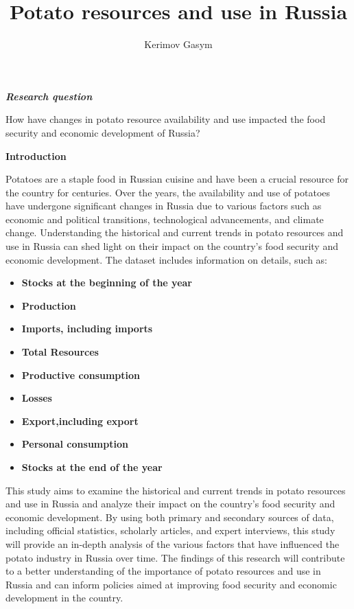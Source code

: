 \documentclass[
  12pt,
]{article}
\title{Potato resources and use in Russia}
\author{Kerimov Gasym}
\date{}
\begin{document}
\maketitle

\textbf{\emph{Research question }}

How have changes in potato resource availability and use impacted the food security and economic development of Russia?

\textbf{Introduction}

Potatoes are a staple food in Russian cuisine and have been a crucial resource for the country for centuries. Over the years, the availability and use of potatoes have undergone significant changes in Russia due to various factors such as economic and political transitions, technological advancements, and climate change. Understanding the historical and current trends in potato resources and use in Russia can shed light on their impact on the country's food security and economic development. The dataset includes information on details, such as:

\begin{itemize}
\item
  \textbf{Stocks at the beginning of the year}
\item
  \textbf{Production}
\item
  \textbf{Imports, including imports}
\item
  \textbf{Total Resources}
\item
  \textbf{Productive consumption}
\item
  \textbf{Losses}
\item
  \textbf{Export,including export}
\item
  \textbf{Personal consumption }
\item
  \textbf{Stocks at the end of the year }
\end{itemize}

This study aims to examine the historical and current trends in potato resources and use in Russia and analyze their impact on the country's food security and economic development. By using both primary and secondary sources of data, including official statistics, scholarly articles, and expert interviews, this study will provide an in-depth analysis of the various factors that have influenced the potato industry in Russia over time. The findings of this research will contribute to a better understanding of the importance of potato resources and use in Russia and can inform policies aimed at improving food security and economic development in the country.
\end{document}
